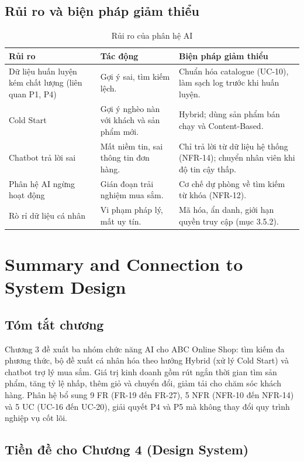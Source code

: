 \documentclass[12pt,a4paper,oneside]{report}
\begin{document}
\subsection{Rủi ro và biện pháp giảm thiểu}

\begin{longtable}{p{4.4cm}p{5.8cm}p{5.8cm}}
\caption{Rủi ro của phân hệ AI}\\
\toprule
\textbf{Rủi ro} & \textbf{Tác động} & \textbf{Biện pháp giảm thiểu} \\
\midrule
\endhead
\bottomrule
\endlastfoot
Dữ liệu huấn luyện kém chất lượng (liên quan P1, P4) & Gợi ý sai, tìm kiếm lệch. & Chuẩn hóa catalogue (UC-10), làm sạch log trước khi huấn luyện. \\
Cold Start & Gợi ý nghèo nàn với khách và sản phẩm mới. & Hybrid; dùng sản phẩm bán chạy và Content-Based. \\
Chatbot trả lời sai & Mất niềm tin, sai thông tin đơn hàng. & Chỉ trả lời từ dữ liệu hệ thống (NFR-14); chuyển nhân viên khi độ tin cậy thấp. \\
Phân hệ AI ngừng hoạt động & Gián đoạn trải nghiệm mua sắm. & Cơ chế dự phòng về tìm kiếm từ khóa (NFR-12). \\
Rò rỉ dữ liệu cá nhân & Vi phạm pháp lý, mất uy tín. & Mã hóa, ẩn danh, giới hạn quyền truy cập (mục 3.5.2). \\
\end{longtable}

\section{Summary and Connection to System Design}

\subsection{Tóm tắt chương}

Chương 3 đề xuất ba nhóm chức năng AI cho ABC Online Shop: tìm kiếm đa phương thức, bộ đề xuất cá nhân hóa theo hướng Hybrid (xử lý Cold Start) và chatbot trợ lý mua sắm. Giá trị kinh doanh gồm rút ngắn thời gian tìm sản phẩm, tăng tỷ lệ nhấp, thêm giỏ và chuyển đổi, giảm tải cho chăm sóc khách hàng. Phân hệ bổ sung 9 FR (FR-19 đến FR-27), 5 NFR (NFR-10 đến NFR-14) và 5 UC (UC-16 đến UC-20), giải quyết P4 và P5 mà không thay đổi quy trình nghiệp vụ cốt lõi.

\subsection{Tiền đề cho Chương 4 (Design System)}
\end{document}
